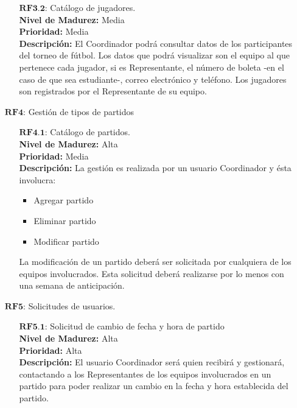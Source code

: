 \begin{enumerate}
\begin{enumerate}
			\item[$\textbf{RF3.2:}$] Catálogo de jugadores.\\
				\tab \textbf{Nivel de Madurez:} Media \\
				\tab \textbf{Prioridad:} Media  \\
				\tab \textbf{Descripción:} El Coordinador podrá consultar datos de los participantes del torneo de fútbol. Los datos que podrá visualizar son el equipo al que pertenece cada jugador, si es Representante, el número de boleta -en el caso de que sea estudiante-, correo electrónico y teléfono. Los jugadores son registrados por el Representante de su equipo. \\
		\end{enumerate}
	\item[$\textbf{RF4:}$] Gestión de tipos de partidos
		\begin{enumerate}
			\item[$\textbf{RF4.1:}$] Catálogo de partidos.\\
				\tab \textbf{Nivel de Madurez:} Alta \\
				\tab \textbf{Prioridad:} Media  \\
				\tab \textbf{Descripción:} La gestión es realizada por un usuario Coordinador y ésta involucra: 
					\begin{itemize}
						\item Agregar partido
						\item Eliminar partido
						\item Modificar partido 
					\end{itemize}
					\tab La modificación de un partido deberá ser solicitada por cualquiera de los equipos involucrados. Esta solicitud deberá realizarse por lo menos con una semana de anticipación. \\
		\end{enumerate}
	\item[$\textbf{RF5:}$] Solicitudes de usuarios.
		\begin{enumerate}
			\item[$\textbf{RF5.1:}$] Solicitud de cambio de fecha y hora de partido\\
				\tab \textbf{Nivel de Madurez:} Alta \\
				\tab \textbf{Prioridad:} Alta  \\
				\tab \textbf{Descripción:} El usuario Coordinador será quien recibirá y gestionará, contactando a los Representantes de los equipos involucrados en un partido para poder realizar un cambio en la fecha y hora establecida del partido.\\

\end{enumerate}
\end{enumerate}
